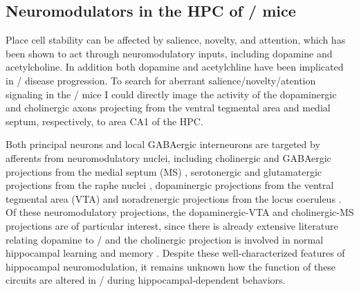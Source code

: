 \subsection{Neuromodulators in the \ac{HPC} of \df/ mice}
Place cell stability can be affected by salience, novelty, and attention, which has been shown to act through neuromodulatory inputs, including dopamine and acetylcholine.
In addition both dopamine and acetylchline have been implicated in \scz/ disease progression.
To search for aberrant salience/novelty/atention signaling in the \df/ mice I could directly image the activity of the dopaminergic and cholinergic axons projecting from the ventral tegmental area and medial septum, respectively, to area CA1 of the \ac{HPC}.

Both principal neurons and local GABAergic interneurons are targeted by afferents from neuromodulatory nuclei, including cholinergic and GABAergic projections from the medial septum (MS) \citep{Klausberger2008}, serotonergic and glutamatergic projections from the raphe nuclei \citep{Varga2009}, dopaminergic projections from the ventral tegmental area (VTA) \citep{Gasbarri1997} and noradrenergic projections from the locus coeruleus \citep{Foote1983}.
Of these neuromodulatory projections, the dopaminergic-VTA and cholinergic-MS projections are of particular interest, since there is already extensive literature relating dopamine to \scz/ \citep{Davis1991} and the cholinergic projection is involved in normal hippocampal learning and memory \citep{Parent2004}.
Despite these well-characterized features of hippocampal neuromodulation, it remains unknown how the function of these circuits are altered in \scz/ during hippocampal-dependent behaviors.
